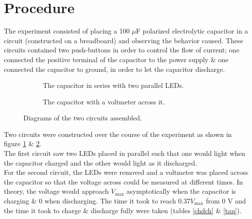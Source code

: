 \documentclass{article}
\begin{document}
\section{Procedure}
	The experiment consisted of placing a 100 $\mu$F polarized electrolytic capacitor in a circuit (constructed on a breadboard) and observing the behavior caused. These circuits contained two push-buttons in order to control the flow of current; one connected the positive terminal of the capacitor to the power supply \& one connected the capacitor to ground, in order to let the capacitor discharge.
	\begin{figure}[H]
		\begin{subfigure}{0.5\textwidth}
			
			\caption{The capacitor in series with two parallel LEDs.}
			\label{circuit1}
		\end{subfigure}
		\begin{subfigure}{0.5\textwidth}
			
			\caption{The capacitor with a voltmeter across it.}
			\label{circuit2}
		\end{subfigure}
		\caption{Diagrams of the two circuits assembled.}
		\label{diagrams}
	\end{figure}
	Two circuits were constructed over the course of the experiment as shown in figure \ref{circuit1} \& \ref{circuit2}.\\
	The first circuit saw two LEDs placed in parallel such that one would light when the capacitor charged and the other would light as it discharged.\\
	For the second circuit, the LEDs were removed and a voltmeter was placed across the capacitor so that the voltage across could be measured at different times. In theory, the voltage would approach $V_\mathrm{max}$ asymptotically when the capacitor is charging \& 0 when discharging.
	The time it took to reach $0.37V_\mathrm{max}$ from 0 V and the time it took to charge \& discharge fully were taken (tables \ref{chdch} \& \ref{tau}).
\end{document}
